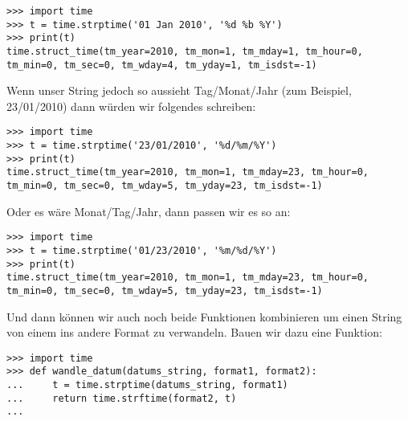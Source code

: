 \begin{Verbatim}[frame=single]
>>> import time
>>> t = time.strptime('01 Jan 2010', '%d %b %Y')
>>> print(t)
time.struct_time(tm_year=2010, tm_mon=1, tm_mday=1, tm_hour=0, 
tm_min=0, tm_sec=0, tm_wday=4, tm_yday=1, tm_isdst=-1)
\end{Verbatim}

\noindent
Wenn unser String jedoch so aussieht Tag/Monat/Jahr (zum Beispiel, 23/01/2010) dann würden wir folgendes schreiben:

\begin{Verbatim}[frame=single]
>>> import time
>>> t = time.strptime('23/01/2010', '%d/%m/%Y')
>>> print(t)
time.struct_time(tm_year=2010, tm_mon=1, tm_mday=23, tm_hour=0, 
tm_min=0, tm_sec=0, tm_wday=5, tm_yday=23, tm_isdst=-1)

\end{Verbatim}

\noindent
Oder es wäre Monat/Tag/Jahr, dann passen wir es so an:

\begin{Verbatim}[frame=single]
>>> import time
>>> t = time.strptime('01/23/2010', '%m/%d/%Y')
>>> print(t)
time.struct_time(tm_year=2010, tm_mon=1, tm_mday=23, tm_hour=0, 
tm_min=0, tm_sec=0, tm_wday=5, tm_yday=23, tm_isdst=-1)
\end{Verbatim}

\noindent
Und dann können wir auch noch beide Funktionen kombinieren um einen String von einem ins andere Format zu verwandeln. Bauen wir dazu eine Funktion:

\begin{Verbatim}[frame=single]
>>> import time
>>> def wandle_datum(datums_string, format1, format2):
...     t = time.strptime(datums_string, format1)
...     return time.strftime(format2, t)
...
\end{Verbatim}


